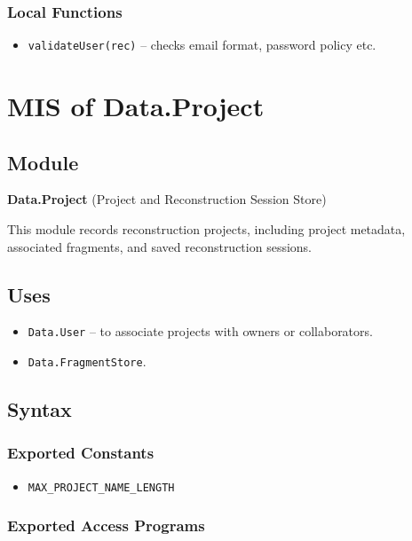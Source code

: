 \documentclass[12pt, titlepage]{article}
\begin{document}
\subsubsection{Local Functions}
\begin{itemize}
    \item \texttt{validateUser(rec)} – checks email format, password policy etc.
\end{itemize}



\section{MIS of Data.Project} \label{Data.Project}

\subsection{Module}
\textbf{Data.Project} \; (Project and Reconstruction Session Store)

This module records reconstruction projects, including project metadata, associated fragments, and saved reconstruction sessions.

\subsection{Uses}
\begin{itemize}
    \item \texttt{Data.User} – to associate projects with owners or collaborators.
    \item \texttt{Data.FragmentStore}.
\end{itemize}

\subsection{Syntax}

\subsubsection{Exported Constants}
\begin{itemize}
    \item \texttt{MAX\_PROJECT\_NAME\_LENGTH}
\end{itemize}

\subsubsection{Exported Access Programs}
\end{document}
